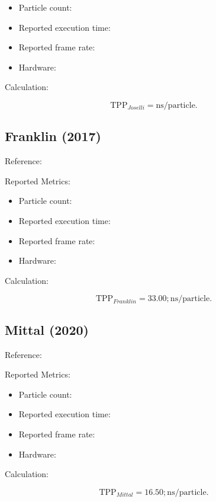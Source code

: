 \begin{itemize}
\item Particle count:
\item Reported execution time:
\item Reported frame rate:
\item Hardware:
\end{itemize}

Calculation:

\begin{equation}
\mathrm{TPP}_{Joselli}=\mathrm{ns/particle}.
\end{equation}

\subsection{Franklin (2017)}

Reference:
\cite{franklin}

Reported Metrics:

\begin{itemize}
\item Particle count:
\item Reported execution time:
\item Reported frame rate:
\item Hardware:
\end{itemize}

Calculation:

\begin{equation}
\mathrm{TPP}_{Franklin}=33.00;\mathrm{ns/particle}.
\end{equation}

\subsection{Mittal (2020)}

Reference:
\cite{mittal}

Reported Metrics:

\begin{itemize}
\item Particle count:
\item Reported execution time:
\item Reported frame rate:
\item Hardware:
\end{itemize}

Calculation:

\begin{equation}
\mathrm{TPP}_{Mittal}=16.50;\mathrm{ns/particle}.
\end{equation}

